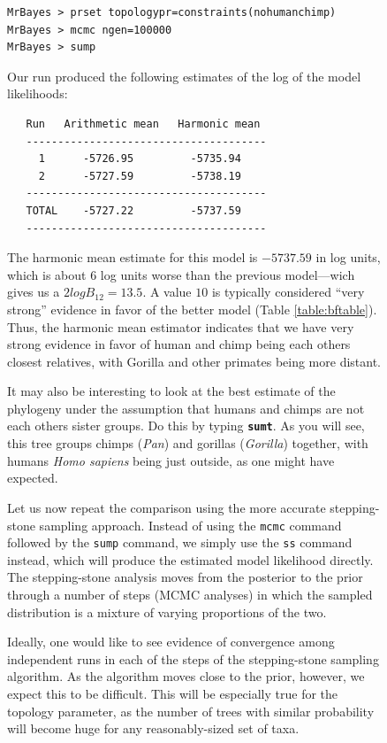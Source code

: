 \documentclass[12pt]{book}
\newcommand{\ttt}[1]{\texttt{#1}}
\newcommand{\tb}[1]{\ttt{\textbf{#1}}}
\begin{document}
\begin{figure}[h]
\begin{singlespacing}
\small
\begin{verbatim}
MrBayes > prset topologypr=constraints(nohumanchimp)
MrBayes > mcmc ngen=100000
MrBayes > sump
\end{verbatim}
\end{singlespacing}
\normalsize

Our run produced the following estimates of the log of the model likelihoods:

\begin{singlespacing}
\footnotesize
\begin{verbatim}
   Run   Arithmetic mean   Harmonic mean
   --------------------------------------
     1      -5726.95         -5735.94
     2      -5727.59         -5738.19
   --------------------------------------
   TOTAL    -5727.22         -5737.59
   --------------------------------------
\end{verbatim}
\end{singlespacing}
\normalsize

The harmonic mean estimate for this model is $-5737.59$ in log units, which is about 6 log units
worse than the previous model---wich gives us a $2logB_{12} = 13.5$. A value $10$ is typically
considered ``very strong'' evidence in favor of the better model (Table \ref{table:bftable}). Thus,
the harmonic mean estimator indicates that we have very strong evidence in favor of human and chimp
being each others closest relatives, with Gorilla and other primates being more distant.

It may also be interesting to look at the best estimate of the phylogeny under the assumption that
humans and chimps are not each others sister groups. Do this by typing \tb{sumt}. As you will see,
this tree groups chimps (\textit{Pan}) and gorillas (\textit{Gorilla}) together, with humans
\textit{Homo sapiens} being just outside, as one might have expected.

Let us now repeat the comparison using the more accurate stepping-stone sampling approach. Instead
of using the \ttt{mcmc} command followed by the \ttt{sump} command, we simply use the \ttt{ss}
command instead, which will produce the estimated model likelihood directly. The stepping-stone
analysis moves from the posterior to the prior through a number of steps (MCMC analyses) in which
the sampled distribution is a mixture of varying proportions of the two.

Ideally, one would like to see evidence of convergence among independent runs in each of the steps
of the stepping-stone sampling algorithm. As the algorithm moves close to the prior, however, we
expect this to be difficult. This will be especially true for the topology parameter, as the number
of trees with similar probability will become huge for any reasonably-sized set of taxa.


\end{figure}
\end{document}
